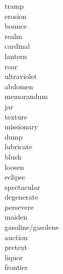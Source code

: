 \documentclass[b5paper, 11pt]{ctexart}
\begin{document}
\begin{multicols*}{3}
\begin{description}
\item[tramp]

\item[erosion]

\item[bounce]

\item[realm]

\item[cardinal]

\item[lantern]

\item[roar]

\item[ultraviolet]

\item[abdomen]

\item[memorandum]

\item[jar]

\item[texture]

\item[missionary]

\item[dump]

\item[lubricate]

\item[blush]

\item[loosen]

\item[eclipse]

\item[spectacular]

\item[degenerate]

\item[persevere]

\item[maiden]

\item[gasoline/gasolene]

\item[auction]

\item[pretext]

\item[liquor]

\item[frontier]


\end{description}
\end{multicols*}
\end{document}
